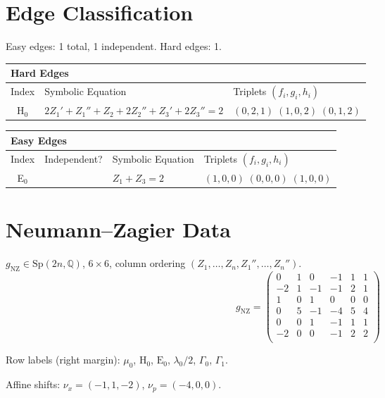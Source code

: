 \documentclass[11pt,a4paper]{article}
\let\oldcheckmark\checkmark
\renewcommand{\checkmark}{\textcolor{pass}{\bfseries\oldcheckmark}}
\begin{document}
\section{Edge Classification}
Easy edges: 1 total, 1 independent. Hard edges: 1.

\begin{longtable}{c l l}
\toprule
\multicolumn{3}{l}{\textbf{Hard Edges}} \\ \midrule
Index & Symbolic Equation & Triplets $(f_i, g_i, h_i)$ \\ \midrule
\endhead
H$_{0}$ & $2Z_{1}' + Z_{1}'' + Z_{2} + 2Z_{2}'' + Z_{3}' + 2Z_{3}'' = 2$ & $(0,2,1)\;(1,0,2)\;(0,1,2)$ \\
\bottomrule
\end{longtable}

\begin{longtable}{c c l l}
\toprule
\multicolumn{4}{l}{\textbf{Easy Edges}} \\ \midrule
Index & Independent? & Symbolic Equation & Triplets $(f_i, g_i, h_i)$ \\ \midrule
\endhead
E$_{0}$ & \checkmark & $Z_{1} + Z_{3} = 2$ & $(1,0,0)\;(0,0,0)\;(1,0,0)$ \\
\bottomrule
\end{longtable}

\section{Neumann--Zagier Data}
$g_{\text{NZ}} \in \mathrm{Sp}(2n, \mathbb{Q})$, $6 \times 6$, column ordering $(Z_1, \ldots, Z_n, Z_1'', \ldots, Z_n'')$.
{\small
\[
g_{\text{NZ}} = \left(\begin{array}{rrrrrr}
  0 & 1 & 0 & -1 & 1 & 1 \\  %
  -2 & 1 & -1 & -1 & 2 & 1 \\  %
  1 & 0 & 1 & 0 & 0 & 0 \\  %
  0 & 5 & -1 & -4 & 5 & 4 \\  %
  0 & 0 & 1 & -1 & 1 & 1 \\  %
  -2 & 0 & 0 & -1 & 2 & 2 \\  %
\end{array}\right)
\]
}

Row labels (right margin): 
$\mu_{0}$, $\text{H}_{0}$, $\text{E}_{0}$, $\lambda_{0}/2$, $\Gamma_{0}$, $\Gamma_{1}$.

Affine shifts: $\nu_x = (-1, 1, -2)$, $\nu_p = (-4, 0, 0)$.
\end{document}
